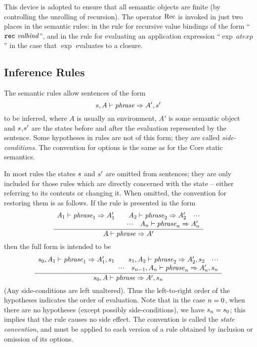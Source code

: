 This device is adopted to ensure that all semantic objects are finite (by
controlling the unrolling of recursion).  The operator $\mathop{\rm Rec}\nolimits$ is invoked in
just two places in the semantic rules: in the rule for recursive value
bindings of the form ``${\tt rec}\ {\it valbind}$'', and in the rule for evaluating
an application expression ``$\exp\ atexp$'' in the case that $\exp$
evaluates to a closure.

\subsection{Inference Rules}
\label{dyncor-inf-rules-sec}
The semantic rules allow sentences  of the form
\[ s,A\vdash{\it phrase}\Rightarrow A',s' \]
to be inferred, where $A$ is usually an environment, $A'$ is some semantic
object and $s$,$s'$ are the states before and after the evaluation
represented by the sentence.  Some hypotheses in rules are not of this form;
they are called {\sl side-conditions}.  The convention for options is
the same as for the Core static semantics.  

In most rules the states $s$ and $s'$ are omitted from sentences; they
are only included for those rules which are directly concerned with the state
-- either referring to its contents or changing it.  When omitted, the
convention for restoring them is as follows.  If the rule is presented in the
form
\[ \frac{ \begin{array}{r}
          A_1\vdash{\it phrase}_1\Rightarrow A_1'\qquad
          A_2\vdash{\it phrase}_2\Rightarrow A_2'\quad\mbox{$\cdot\!\cdot\!\cdot$}\\
          \mbox{$\cdot\!\cdot\!\cdot$}\quad A_n\vdash{\it phrase}_n\Rightarrow A_n'
          \end{array}
        }
        { A\vdash{\it phrase}\Rightarrow A'} \]
then the full form is intended to be
\[ \frac{ \begin{array}{r}
          s_0,A_1\vdash{\it phrase}_1\Rightarrow A_1',s_1\qquad
          s_1,A_2\vdash{\it phrase}_2\Rightarrow A_2',s_2\quad\mbox{$\cdot\!\cdot\!\cdot$}\\
          \mbox{$\cdot\!\cdot\!\cdot$}\quad s_{n-1},A_n\vdash{\it phrase}_n\Rightarrow A_n',s_n
          \end{array}
        }
        { s_0,A\vdash{\it phrase}\Rightarrow A',s_n} \]
(Any side-conditions are left unaltered).
Thus the left-to-right order of the hypotheses indicates the order of
evaluation.  Note that in the case $n=0$, when there are no hypotheses
(except possibly side-conditions), we have $s_n=s_0$; this implies that the
rule causes no side effect.
The convention is called the {\sl state convention}, and
must be applied to each version of a rule obtained by inclusion or
omission of its options.

